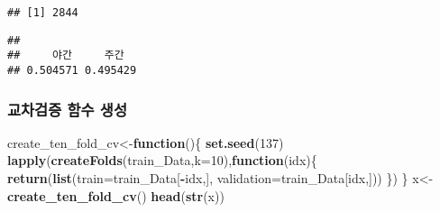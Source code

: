 \documentclass[]{article}
\newenvironment{Shaded}{\begin{snugshade}}{\end{snugshade}}
\newcommand{\KeywordTok}[1]{\textcolor[rgb]{0.13,0.29,0.53}{\textbf{#1}}}
\newcommand{\DataTypeTok}[1]{\textcolor[rgb]{0.13,0.29,0.53}{#1}}
\newcommand{\DecValTok}[1]{\textcolor[rgb]{0.00,0.00,0.81}{#1}}
\newcommand{\ControlFlowTok}[1]{\textcolor[rgb]{0.13,0.29,0.53}{\textbf{#1}}}
\newcommand{\OperatorTok}[1]{\textcolor[rgb]{0.81,0.36,0.00}{\textbf{#1}}}
\newcommand{\NormalTok}[1]{#1}
\begin{document}
\begin{verbatim}
## [1] 2844
\end{verbatim}

\begin{Shaded}
\end{Shaded}

\begin{verbatim}
## 
##     야간     주간 
## 0.504571 0.495429
\end{verbatim}

\subsubsection{교차검증 함수 생성}\label{--}

\begin{Shaded}
\begin{Highlighting}[]
\NormalTok{create_ten_fold_cv<-}\ControlFlowTok{function}\NormalTok{()\{}
  \KeywordTok{set.seed}\NormalTok{(}\DecValTok{137}\NormalTok{)}
  \KeywordTok{lapply}\NormalTok{(}\KeywordTok{createFolds}\NormalTok{(train_Data,}\DataTypeTok{k=}\DecValTok{10}\NormalTok{),}\ControlFlowTok{function}\NormalTok{(idx)\{}
    \KeywordTok{return}\NormalTok{(}\KeywordTok{list}\NormalTok{(}\DataTypeTok{train=}\NormalTok{train_Data[}\OperatorTok{-}\NormalTok{idx,],}
                \DataTypeTok{validation=}\NormalTok{train_Data[idx,]))}
\NormalTok{  \})}
\NormalTok{\}}
\NormalTok{x<-}\KeywordTok{create_ten_fold_cv}\NormalTok{()}
\KeywordTok{head}\NormalTok{(}\KeywordTok{str}\NormalTok{(x))}
\end{Highlighting}
\end{Shaded}
\end{document}
